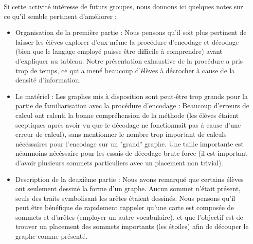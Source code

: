\documentclass{article}
\begin{document}
Si cette activité intéresse de futurs groupes, nous donnons ici quelques notes sur ce qu'il semble pertinent d'améliorer : 
\begin{itemize}
\item Organisation de la première partie : Nous pensons qu'il soit plus pertinent de laisser les élèves explorer d'eux-même la procédure d'encodage et décodage (bien que le langage employé puisse être difficile à comprendre) avant d'expliquer au tableau. Notre présentation exhaustive de la procédure a pris trop de temps, ce qui a mené beaucoup d'élèves à décrocher à cause de la densité d'information.

\item Le matériel : Les graphes mis à disposition sont peut-être trop grands pour la partie de familiarisation avec la procédure d'encodage : Beaucoup d'erreurs de calcul ont ralenti la bonne compréhension de la méthode (les élèves étaient sceptiques après avoir vu que le décodage ne fonctionnait pas à cause d'une erreur de calcul), sans mentionner le nombre trop important de calculs nécéssaires pour l'encodage sur un "grand" graphe. Une taille importante est néanmoins nécéssaire pour les essais de décodage brute-force (il est important d'avoir plusieurs sommets particuliers avec un placement non trivial).

\item Description de la deuxième partie : Nous avons remarqué que certains élèves ont seulement dessiné la forme d'un graphe. Aucun sommet n'était présent, seuls des traits symbolisant les arêtes étaient dessinés. Nous pensons qu'il peut être bénéfique de rapidement rappeler qu'une carte est composée de sommets et d'arêtes (employer un autre vocabulaire), et que l'objectif est de trouver un placement des sommets importants (les étoiles) afin de découper le graphe comme présenté.
\end{itemize}
\end{document}

